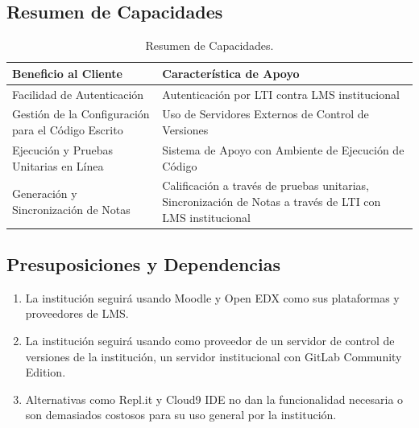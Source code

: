 \subsection{Resumen de Capacidades}
\begin{table}[h!]
  \begin{tabular}{|p{}|p{}|}
    \hline
    \textbf{Beneficio al Cliente} & \textbf{Característica de Apoyo} \\
    \hline
    Facilidad de Autenticación & Autenticación por LTI contra LMS institucional \\
    \hline
    Gestión de la Configuración para el Código Escrito & Uso de Servidores Externos de Control de Versiones \\
    \hline
    Ejecución y Pruebas Unitarias en Línea & Sistema de Apoyo con Ambiente de Ejecución de Código \\
    \hline
    Generación y Sincronización de Notas & Calificación a través de pruebas unitarias, Sincronización de Notas a través de LTI con LMS institucional \\
    \hline
  \end{tabular}
  \caption{Resumen de Capacidades.}
  \label{res-cap}
\end{table}

\subsection{Presuposiciones y Dependencias}
\begin{enumerate}
	\item La institución seguirá usando Moodle y Open EDX como sus plataformas y proveedores de LMS.
	\item La institución seguirá usando como proveedor de un servidor de control de versiones de la institución, un servidor institucional con GitLab Community Edition.
	\item Alternativas como Repl.it y Cloud9 IDE no dan la funcionalidad necesaria o son demasiados costosos para su uso general por la institución.
\end{enumerate}


